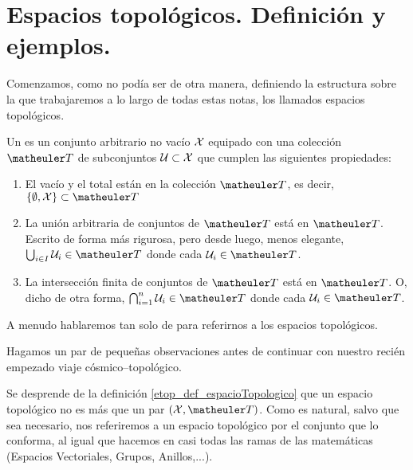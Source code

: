 \section{Espacios topológicos. Definición y ejemplos.}
\label{etop_definicionEjemplos}
Comenzamos, como no podía ser de otra manera, definiendo la estructura sobre la que trabajaremos a lo largo de todas estas notas, los llamados espacios topológicos.
\begin{defi}[Espacio topológico]
	\label{etop_def_espacioTopologico}
	Un  es un conjunto arbitrario no vacío $\mathcal{X}$ equipado con una colección $\T$ de subconjuntos $\mathcal{U}\subset\mathcal{X}$ que cumplen las siguientes propiedades:
	\begin{enumerate}
		\item[\tb{T1}] El vacío y el total están en la colección $\T$, es decir, $\{\emptyset, \X\} \subset \T$
		\item[\tb{T2}] La unión arbitraria de conjuntos de $\T$ está en $\T$. Escrito de forma más rigurosa, pero desde luego, menos elegante, 
		$\bigcup_{i\in I}\U_i\in\T$ donde cada $\U_i\in\T$.
		\item[\tb{T3}] La intersección finita de conjuntos de $\T$ está en $\T$. O, dicho de otra forma, $\bigcap_{i=1}^{n}\U_i\in\T$ donde cada $\U_i\in\T$.
	\end{enumerate}
	A menudo hablaremos tan solo de  para referirnos a los espacios topológicos.
\end{defi}
Hagamos un par de pequeñas observaciones antes de continuar con nuestro recién empezado viaje cósmico--topológico.
\begin{obs}[Sutilezas]
	\label{etop_obs_sutilezas}
	Se desprende de la definición \ref{etop_def_espacioTopologico} que un espacio topológico no es más que un par $(\X, \T)$. Como es natural, salvo que sea necesario, nos referiremos a un espacio topológico por el conjunto que lo conforma, al igual que hacemos en casi todas las ramas de las matemáticas (Espacios Vectoriales, Grupos, Anillos,...).
\end{obs}

